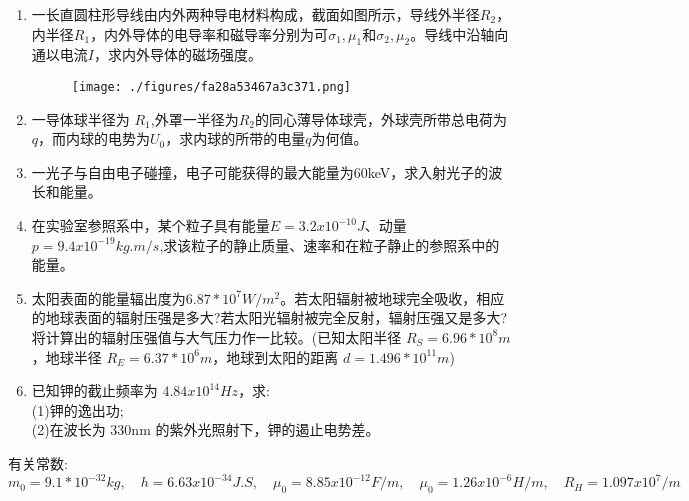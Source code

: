 \begin{enumerate}
\begin{figure}[ht]
\caption{} \label{fig_SD11_2}
\end{figure}
\item 一长直圆柱形导线由内外两种导电材料构成，截面如图所示，导线外半径$R_2$，内半径$R_1$，内外导体的电导率和磁导率分别为可$\sigma_1,\mu_1$和$\sigma_2,\mu_2$。导线中沿轴向通以电流$I$，求内外导体的磁场强度。
\begin{figure}[ht]
\centering
\texttt{[image: ./figures/fa28a53467a3c371.png]}
\caption{} \label{fig_SD11_1}
\end{figure}
\item 一导体球半径为 $R_1$,外罩一半径为$ R_2$的同心薄导体球壳，外球壳所带总电荷为$q$，而内球的电势为$ U_0$，求内球的所带的电量$ q$为何值。
\item 一光子与自由电子碰撞，电子可能获得的最大能量为60keV，求入射光子的波长和能量。
\item 在实验室参照系中，某个粒子具有能量$E=3.2x10^{-10}J$、动量$p=9.4x10^{-19}kg.m/s$,求该粒子的静止质量、速率和在粒子静止的参照系中的能量。
\item 太阳表面的能量辐出度为$6.87*10^7 W/m^2$。若太阳辐射被地球完全吸收，相应的地球表面的辐射压强是多大?若太阳光辐射被完全反射，辐射压强又是多大?将计算出的辐射压强值与大气压力作一比较。(已知太阳半径 $R_S=6.96*10^8m$，地球半径 $R_E=6.37*10^6m$，地球到太阳的距离 $d=1.496*10^{11}m$)
\item 已知钾的截止频率为 $4.84x10^{14}Hz$，求:\\
(1)钾的逸出功;\\
(2)在波长为 330nm 的紫外光照射下，钾的遏止电势差。




\end{enumerate}
有关常数:$m_0=9.1*10^{-32}kg,\quad h=6.63x10^{-34}J.S,\quad \mu_0=8.85x10^{-12}F/m,\quad \mu_0=1.26x10^{-6} H/m,
\quad R_H=1.097x10^7/m$
